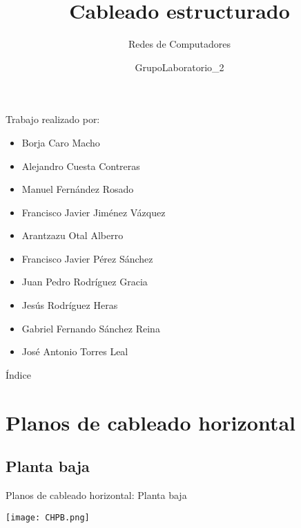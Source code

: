 \documentclass{beamer}
\title{Cableado estructurado}
\author{Redes de Computadores}
\date{GrupoLaboratorio\_2}
\begin{document}
\begin{frame}
	\titlepage
\end{frame}

\begin{frame}{Trabajo realizado por:}
	  \begin{itemize}
	  \item{Borja Caro Macho}
	  \item{Alejandro Cuesta Contreras}
	  \item{Manuel Fernández Rosado}
	  \item{Francisco Javier Jiménez Vázquez}
	  \item{Arantzazu Otal Alberro}
	  \item{Francisco Javier Pérez Sánchez}
	  \item{Juan Pedro Rodríguez Gracia}
	  \item{Jesús Rodríguez Heras}
	  \item{Gabriel Fernando Sánchez Reina}
	  \item{José Antonio Torres Leal}
	  \end{itemize}
\end{frame}



\begin{frame}{Índice}
  \tableofcontents
\end{frame}

\section{Planos de cableado horizontal}
\subsection{Planta baja}

\begin{frame}{Planos de cableado horizontal: Planta baja}
\begin{center}
	\texttt{[image: CHPB.png]}
\end{center}

\end{frame}
\end{document}
